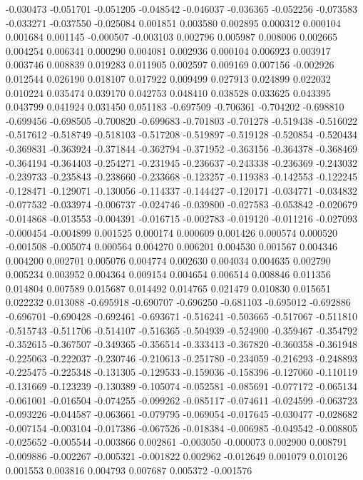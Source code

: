 -0.030473
-0.051701
-0.051205
-0.048542
-0.046037
-0.036365
-0.052256
-0.073583
-0.033271
-0.037550
-0.025084
0.001851
0.003580
0.002895
0.000312
0.000104
0.001684
0.001145
-0.000507
-0.003103
0.002796
0.005987
0.008006
0.002665
0.004254
0.006341
0.000290
0.004081
0.002936
0.000104
0.006923
0.003917
0.003746
0.008839
0.019283
0.011905
0.002597
0.009169
0.007156
-0.002926
0.012544
0.026190
0.018107
0.017922
0.009499
0.027913
0.024899
0.022032
0.010224
0.035474
0.039170
0.042753
0.048410
0.038528
0.033625
0.043395
0.043799
0.041924
0.031450
0.051183
-0.697509
-0.706361
-0.704202
-0.698810
-0.699456
-0.698505
-0.700820
-0.699683
-0.701803
-0.701278
-0.519438
-0.516022
-0.517612
-0.518749
-0.518103
-0.517208
-0.519897
-0.519128
-0.520854
-0.520434
-0.369831
-0.363924
-0.371844
-0.362794
-0.371952
-0.363156
-0.364378
-0.368469
-0.364194
-0.364403
-0.254271
-0.231945
-0.236637
-0.243338
-0.236369
-0.243032
-0.239733
-0.235843
-0.238660
-0.233668
-0.123257
-0.119383
-0.142553
-0.122245
-0.128471
-0.129071
-0.130056
-0.114337
-0.144427
-0.120171
-0.034771
-0.034832
-0.077532
-0.033974
-0.006737
-0.024746
-0.039800
-0.027583
-0.053842
-0.020679
-0.014868
-0.013553
-0.004391
-0.016715
-0.002783
-0.019120
-0.011216
-0.027093
-0.000454
-0.004899
0.001525
0.000174
0.000609
0.001426
0.000574
0.000520
-0.001508
-0.005074
0.000564
0.004270
0.006201
0.004530
0.001567
0.004346
0.004200
0.002701
0.005076
0.004774
0.002630
0.004034
0.004635
0.002790
0.005234
0.003952
0.004364
0.009154
0.004654
0.006514
0.008846
0.011356
0.014804
0.007589
0.015687
0.014492
0.014765
0.021479
0.010830
0.015651
0.022232
0.013088
-0.695918
-0.690707
-0.696250
-0.681103
-0.695012
-0.692886
-0.696701
-0.690428
-0.692461
-0.693671
-0.516241
-0.503665
-0.517067
-0.511810
-0.515743
-0.511706
-0.514107
-0.516365
-0.504939
-0.524900
-0.359467
-0.354792
-0.352615
-0.367507
-0.349365
-0.356514
-0.333413
-0.367820
-0.360358
-0.361948
-0.225063
-0.222037
-0.230746
-0.210613
-0.251780
-0.234059
-0.216293
-0.248893
-0.225475
-0.225348
-0.131305
-0.129533
-0.159036
-0.158396
-0.127060
-0.110119
-0.131669
-0.123239
-0.130389
-0.105074
-0.052581
-0.085691
-0.077172
-0.065134
-0.061001
-0.016504
-0.074255
-0.099262
-0.085117
-0.074611
-0.024599
-0.063723
-0.093226
-0.044587
-0.063661
-0.079795
-0.069054
-0.017645
-0.030477
-0.028682
-0.007154
-0.003104
-0.017386
-0.067526
-0.018384
-0.006985
-0.049542
-0.008805
-0.025652
-0.005544
-0.003866
0.002861
-0.003050
-0.000073
0.002900
0.008791
-0.009886
-0.002267
-0.005321
-0.001822
0.002962
-0.012649
0.001079
0.010126
0.001553
0.003816
0.004793
0.007687
0.005372
-0.001576
